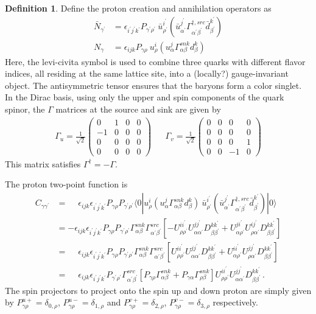\documentclass[prd,12pt,superscriptaddress,tightenlines,nofootinbib]{revtex4}
\def\a{{\alpha}}
\def\b{{\beta}}
\def\g{{\gamma}}
\def\G{{\Gamma}}
\def\ip{{i^\prime}}
\def\jp{{j^\prime}}
\def\kp{{k^\prime}}
\def\ap{{\alpha^\prime}}
\def\bp{{\beta^\prime}}
\def\gp{{\gamma^\prime}}
\def\rp{{\rho^\prime}}
\theoremstyle{plain}
\theoremstyle{definition}
\newtheorem{defn}[thm]{Definition}
\theoremstyle{remark}
\begin{document}
\begin{defn}
Define the proton creation and annihilation operators as
\begin{align}
\bar{N}_{\gp} &= \epsilon_{\ip\jp\kp} P_{\gp\rp}\ \bar{u}^\ip_\rp (\bar{u}^{\jp}_{\ap} \G^{\dagger,src}_{\ap\bp} \bar{d}^\kp_\bp ) 
\\
N_{\g} &= \epsilon_{ijk} P_{\g\rho}\ u^i_\rho (u^j_\a \G^{snk}_{\a\b} d^k_\b ) 
\end{align}
Here, the levi-civita symbol is used to combine three quarks with different flavor indices, all residing 
at the same lattice site, into a (locally?) gauge-invariant object. The antisymmetric tensor ensures that the baryons 
form a color singlet. 
In the Dirac basis, using only the upper and spin components of the quark spinor, the $\G$ matrices at the source and sink are given by
\begin{align}
\G_{u} = \frac{1}{\sqrt{2}}\begin{pmatrix}
	0& 1& 0& 0\\
	-1& 0& 0& 0\\
	0& 0& 0& 0\\
	0& 0& 0& 0
	\end{pmatrix} && \G_{v} =  \frac{1}{\sqrt{2}}\begin{pmatrix}
	0& 0& 0& 0\\
	0& 0& 0& 0\\
	0& 0& 0& 1\\
	0& 0& -1& 0
	\end{pmatrix}
\end{align}
This matrix satisfies $\G^\dagger = -\G$.

The proton two-point function is
\begin{align}
C_{\g\gp} &= \phantom{-}\epsilon_{ijk} \epsilon_{\ip\jp\kp} P_{\g\rho} P_{\gp\rp} \langle 0| 
	u^i_\rho (u^j_\a \G^{snk}_{\a\b} d^k_\b ) \ \bar{u}^\ip_\rp (\bar{u}^{\jp}_{\ap} \G^{\dagger,src}_{\ap\bp} \bar{d}^\kp_\bp ) 
	|0\rangle
\nonumber\\ &=
	-\epsilon_{ijk} \epsilon_{\ip\jp\kp} P_{\g\rho} P_{\gp\rp} \G^{snk}_{\a\b} \G^{src}_{\ap\bp}
	\left[ -U^{i\ip}_{\rho\rp} U^{j\jp}_{\a\ap} D^{k\kp}_{\b\bp} 
		+ U^{j\ip}_{\a\rp} U^{i\jp}_{\rho\ap} D^{k\kp}_{\b\bp} 
	\right]
\nonumber\\ &=
	\phantom{-}\epsilon_{ijk} \epsilon_{\ip\jp\kp} P_{\g\rho} P_{\gp\rp} \G^{snk}_{\a\b} \G^{src}_{\ap\bp} 
	\left[
		U^{i\ip}_{\rho\rp} U^{j\jp}_{\a\ap} D^{k\kp}_{\b\bp} 
		+U^{i\ip}_{\a\rp} U^{j\jp}_{\rho\ap} D^{k\kp}_{\b\bp} 
	\right]
\nonumber\\ &=
	\phantom{-}\epsilon_{ijk} \epsilon_{\ip\jp\kp}  P_{\gp\rp}  \G^{src}_{\ap\bp} 
	\left[
		P_{\g\rho} \G^{snk}_{\a\b} + P_{\g\a} \G^{snk}_{\rho\b}
	\right]
	U^{i\ip}_{\rho\rp} U^{j\jp}_{\a\ap} D^{k\kp}_{\b\bp} \, .
\end{align}
The spin projectors to project onto the spin up and down proton are simply given by $P^{u+}_{\g\rho} = \delta_{0,\rho}$, $P^{u-}_{\g\rho} = \delta_{1,\rho}$ and $P^{v+}_{\g\rho} = \delta_{2,\rho}$, $P^{v-}_{\g\rho} = \delta_{3,\rho}$ respectively.


\end{defn}
\end{document}
